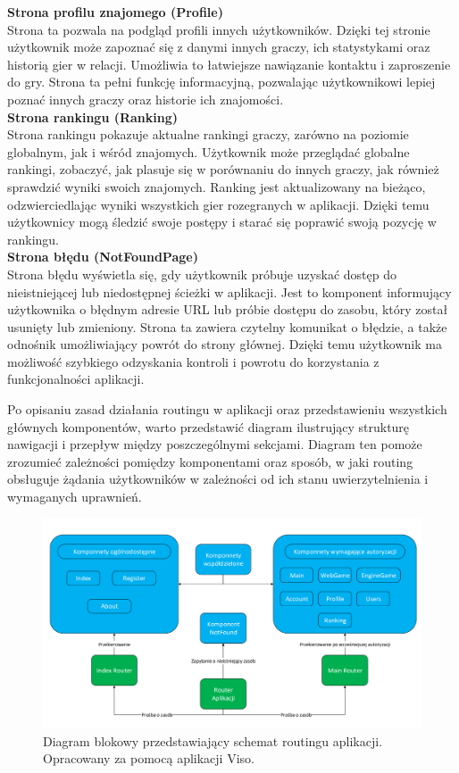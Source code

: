 \documentclass[twoside]{projektInzynierskiMS1}
\begin{document}
\noindent \textbf{Strona profilu znajomego (Profile)}\\
Strona ta pozwala na podgląd profili innych użytkowników. Dzięki tej stronie użytkownik może zapoznać się z danymi innych graczy, ich statystykami oraz historią gier w relacji. Umożliwia to łatwiejsze nawiązanie kontaktu i zaproszenie do gry. Strona ta pełni funkcję informacyjną, pozwalając użytkownikowi lepiej poznać innych graczy oraz historie ich znajomości.
\\

\noindent \textbf{Strona rankingu (Ranking)}\\
Strona rankingu pokazuje aktualne rankingi graczy, zarówno na poziomie globalnym, jak i wśród znajomych. Użytkownik może przeglądać globalne rankingi, zobaczyć, jak plasuje się w porównaniu do innych graczy, jak również sprawdzić wyniki swoich znajomych. Ranking jest aktualizowany na bieżąco, odzwierciedlając wyniki wszystkich gier rozegranych w aplikacji. Dzięki temu użytkownicy mogą śledzić swoje postępy i starać się poprawić swoją pozycję w rankingu.
\\

\noindent \textbf{Strona błędu (NotFoundPage)}\\
Strona błędu wyświetla się, gdy użytkownik próbuje uzyskać dostęp do nieistniejącej lub niedostępnej ścieżki w aplikacji. Jest to komponent informujący użytkownika o błędnym adresie URL lub próbie dostępu do zasobu, który został usunięty lub zmieniony. Strona ta zawiera czytelny komunikat o błędzie, a także odnośnik umożliwiający powrót do strony głównej. Dzięki temu użytkownik ma możliwość szybkiego odzyskania kontroli i powrotu do korzystania z funkcjonalności aplikacji.

\newpage

\noindent
Po opisaniu zasad działania routingu w aplikacji oraz przedstawieniu wszystkich głównych komponentów, warto przedstawić diagram ilustrujący strukturę nawigacji i przepływ między poszczególnymi sekcjami. Diagram ten pomoże zrozumieć zależności pomiędzy komponentami oraz sposób, w jaki routing obsługuje żądania użytkowników w zależności od ich stanu uwierzytelnienia i wymaganych uprawnień.

\vspace{1cm}
\begin{figure}[h!]
    \centering
    \includegraphics[width=1\textwidth]{images/diagram_routing.png}
    \caption{Diagram blokowy przedstawiający schemat routingu aplikacji. Opracowany za pomocą aplikacji Viso.}
\end{figure}
\end{document}
